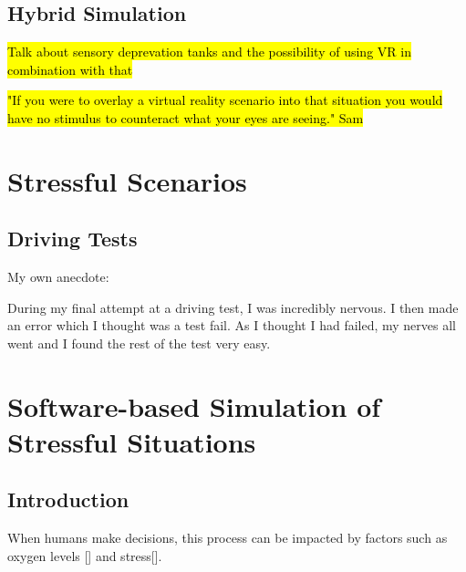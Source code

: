 \documentclass{article}
\begin{document}
\subsection{Hybrid Simulation}


\hl{Talk about sensory deprevation tanks and the possibility of using VR in combination with that}

\hl{"If you were to overlay a virtual reality scenario into that situation you would have no stimulus to counteract what your eyes are seeing." Sam}

\section{Stressful Scenarios}

\subsection{Driving Tests}


My own anecdote: 

During my final attempt at a driving test, I was incredibly nervous. I then made an error which I thought was a test fail. As I thought I had failed, my nerves all went and I found the rest of the test very easy.

\section{Software-based Simulation of Stressful Situations}

\subsection{Introduction}

When humans make decisions, this process can be impacted by factors such as oxygen levels [] and stress[].



\end{document}
